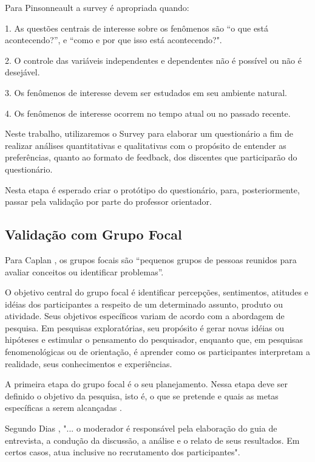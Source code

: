 Para Pinsonneault \cite{pinsonneault1993survey} a survey é apropriada quando:

1. As questões centrais de interesse sobre os fenômenos são “o que está acontecendo?”, e “como e por que isso está acontecendo?".

2. O controle das variáveis independentes e dependentes não é possível ou não é desejável.

3. Os fenômenos de interesse devem ser estudados em seu ambiente natural.

4. Os fenômenos de interesse ocorrem no tempo atual ou no passado recente.

Neste trabalho, utilizaremos o Survey para elaborar um questionário a fim de realizar análises quantitativas e qualitativas com o propósito de entender as preferências, quanto ao formato de feedback, dos discentes que participarão do questionário.

Nesta etapa é esperado criar o protótipo do questionário, para, posteriormente, passar pela validação por parte do professor orientador.

\subsection{Validação com Grupo Focal}

Para Caplan \cite{caplan1990using}, os grupos focais são “pequenos grupos de pessoas reunidos para avaliar conceitos ou identificar problemas”.

O objetivo central do grupo focal é identificar percepções, sentimentos, atitudes e
idéias dos participantes a respeito de um determinado assunto, produto ou atividade. Seus
objetivos específicos variam de acordo com a abordagem de pesquisa. Em pesquisas
exploratórias, seu propósito é gerar novas idéias ou hipóteses e estimular o pensamento do
pesquisador, enquanto que, em pesquisas fenomenológicas ou de orientação, é aprender
como os participantes interpretam a realidade, seus conhecimentos e experiências.\cite{dias2000grupo}

A primeira etapa do grupo focal é o seu planejamento. Nessa etapa deve ser
definido o objetivo da pesquisa, isto é, o que se pretende e quais as metas específicas a
serem alcançadas \cite{dias2000grupo}.

Segundo Dias \cite{dias2000grupo}, "... o moderador é responsável pela elaboração do guia de entrevista, a condução da discussão, a análise e o relato de seus resultados. Em certos casos, atua inclusive no recrutamento dos participantes".


